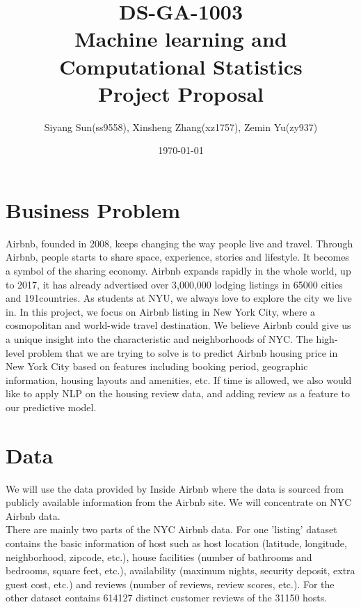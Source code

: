 \documentclass{article}
\begin{document}
\pagestyle{fancy}
\fancyhf{}

\title{DS-GA-1003 \\ Machine learning and Computational Statistics
 \\ Project Proposal}
\date{\today}
\author{Siyang Sun(ss9558), Xinsheng Zhang(xz1757), Zemin Yu(zy937)}
\maketitle


\newpage
\section{Business Problem}

Airbnb, founded in 2008, keeps changing the way people live and travel. Through Airbnb, people starts to share space, experience, stories and lifestyle. It becomes a symbol of the sharing economy. Airbnb expands rapidly in the whole world, up to 2017, it has already advertised over 3,000,000 lodging listings in 65000 cities and 191countries. As students at NYU, we always love to explore the city we live in. In this project, we focus on Airbnb listing in New York City, where a cosmopolitan and world-wide travel destination. We believe Airbnb could give us a unique insight into the characteristic and neighborhoods of NYC.
The high-level problem that we are trying to solve is to predict Airbnb housing price in New York City based on features including booking period, geographic information, housing layouts and amenities, etc. If time is allowed, we also would like to apply NLP on the housing review data, and adding review as a feature to our predictive model.

\section{Data}
We will use the data provided by Inside Airbnb where the data is sourced from publicly available information from the Airbnb site. We will concentrate on NYC Airbnb data. \\

\noindent There are mainly two parts of the NYC Airbnb data. For one 'listing' dataset contains the basic information of host such as host location (latitude, longitude, neighborhood, zipcode, etc.), house facilities (number of bathrooms and bedrooms, square feet, etc.), availability (maximum nights, security deposit, extra guest cost, etc.) and reviews (number of reviews, review scores, etc.). For the other dataset contains 614127 distinct customer reviews of the 31150 hosts.
\end{document}
